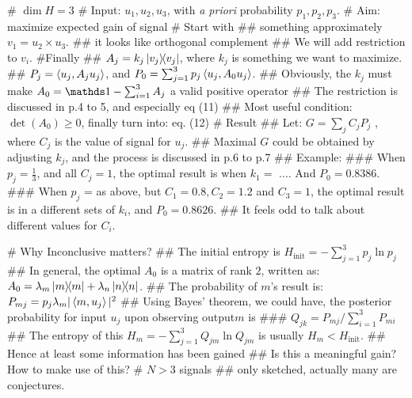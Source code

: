\documentclass{article}
\begin{document}
\begin{easylist}[enumerate]
# $\dim{H} =3$
# Input: $u_1, u_2, u_3$, with \textit{a priori} probability $p_1,p_2,p_3$.
# Aim: maximize expected gain of signal
# Start with 
## something approximately $ v_1=u_2\times u_3$.
## it looks like orthogonal complement
## We will add restriction to $v_i$.
#Finally
## $A_j = k_j \ketbra{v_j}$, where $k_j$ is something we want to maximize.
## $P_j = \braket{u_j, A_j u_j}$, and $P_0 = \sum_{j=1}^3 p_j \braket{u_j, A_0 u_j}$.
## Obviously, the $k_j$ must make $A_0 =\id - \sum_{i=1}^3 A_j$ a valid positive operator
## The restriction is discussed in p.4 to 5, and especially eq (11)
## Most useful condition: $\det(A_0)\geq 0$, finally turn into: eq. (12)
# Result
## Let: $G=\sum_j C_j P_j$ , where $C_j$ is the value of signal for $u_j$.
## Maximal $G$ could be obtained by adjusting $k_j$, and the process is discussed in p.6 to p.7
## Example:
### When $p_j=\frac{1}{3}$, and all $C_j=1$, the optimal result is when $k_1=$ .... And $P_0=0.8386$.
### When $p_j$ = as above, but $C_1=0.8, C_2 = 1.2$ and $C_3=1$, the optimal result is in a different sets of $k_i$, and $P_0 = 0.8626$.
## {\color{red} It feels odd to talk about different values for $C_i$.}

# Why Inconclusive matters?
## The initial entropy is $H_\text{init} = -\sum_{j=1}^3 p_j \ln p_j$ 
## In general, the optimal $A_0$ is a matrix of rank $2$, written as: $A_0 = \lambda_m\ketbra{m} + \lambda_n \ketbra{n}$.
## The probability of $m$'s result is: $P_{mj} = p_j \lambda_m |\braket{m,u_j}|^2$
## Using Bayes' theorem, we could have, the posterior probability for input $u_j$ upon observing output$m$ is
### $Q_{jk} = P_{mj}/\sum_{i=1}^3 P_{mi}$ 
## The entropy of this $H_m = -\sum_{j=1}^3 Q_{jm} \ln Q_{jm}$ is usually $H_m < H_\text{init}$.
## Hence at least some information has been gained
## {\color{red} Is this a meaningful gain? How to make use of this?}
#  $N> 3$ signals
## only sketched, actually many are conjectures.

\end{easylist}
\end{document}
